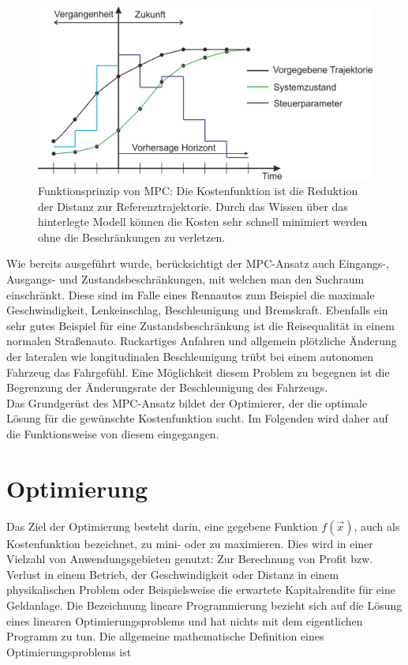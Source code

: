 \documentclass{like}
\begin{document}
\begin{figure}[ht!]
	\centering
	\includegraphics[width=400pt]{Abbildungen/mpcParadigm.png}
	\caption{Funktionsprinzip von \ac{MPC}: Die Kostenfunktion ist die Reduktion der Distanz zur Referenztrajektorie. Durch das Wissen über das hinterlegte Modell können die Kosten sehr schnell minimiert werden ohne die Beschränkungen zu verletzen.}
	\label{fig:mpcTheory}
\end{figure}

Wie bereits ausgeführt wurde, berücksichtigt der \ac{MPC}-Ansatz auch Eingangs-, Ausgangs- und Zustandsbeschränkungen, mit welchen man den Suchraum einschränkt. Diese sind im Falle eines Rennautos zum Beispiel die maximale Geschwindigkeit, Lenkeinschlag, Beschleunigung und Bremskraft. Ebenfalls ein sehr gutes Beispiel für eine Zustandsbeschränkung ist die Reisequalität in einem normalen Straßenauto. Ruckartiges Anfahren und allgemein plötzliche Änderung der lateralen wie longitudinalen Beschleunigung trübt bei einem autonomen Fahrzeug das Fahrgefühl. Eine Möglichkeit diesem Problem zu begegnen ist die Begrenzung der Änderungsrate der Beschleunigung des Fahrzeugs.\\

Das Grundgerüst des \ac{MPC}-Ansatz bildet der Optimierer, der die optimale Lösung für die gewünschte Kostenfunktion sucht. Im Folgenden wird daher auf die Funktionsweise von diesem eingegangen.


\section{Optimierung}
Das Ziel der Optimierung besteht darin, eine gegebene Funktion \(f(\vec{x})\), auch als Kostenfunktion bezeichnet, zu mini- oder zu maximieren. 
Dies wird in einer Vielzahl von Anwendungsgebieten genutzt:
Zur Berechnung von Profit bzw. Verlust in einem Betrieb, der Geschwindigkeit oder Distanz in einem physikalischen Problem oder Beispielsweise die erwartete Kapitalrendite für eine Geldanlage.  
Die Bezeichnung lineare Programmierung bezieht sich auf die Lösung eines linearen  Optimierungsproblems und hat nichts mit dem eigentlichen Programm zu tun. 
Die allgemeine mathematische Definition eines Optimierungsproblems ist
\end{document}
